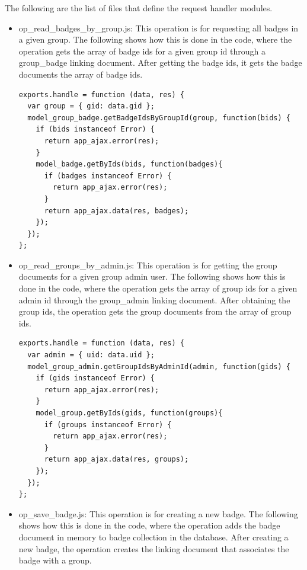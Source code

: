 The following are the list of files that define the request handler modules.

\begin{itemize}
\item op{\_}read{\_}badges{\_}by{\_}group.js: This operation is for requesting all badges in a given group. The following shows how this is done in the code, where the operation gets the array of badge ids for a given group id through a group{\_}badge linking document. After getting the badge ids, it gets the badge documents the array of badge ids. 

\begin{lstlisting}
exports.handle = function (data, res) {
  var group = { gid: data.gid };
  model_group_badge.getBadgeIdsByGroupId(group, function(bids) {
    if (bids instanceof Error) {
      return app_ajax.error(res);
    }
    model_badge.getByIds(bids, function(badges){
      if (badges instanceof Error) {
        return app_ajax.error(res);
      }
      return app_ajax.data(res, badges);
    });
  });
};
\end{lstlisting}

\item op{\_}read{\_}groups{\_}by{\_}admin.js: This operation is for getting the group documents for a given group admin user.  The following shows how this is done in the code, where the operation gets the array of group ids for a given admin id through the group{\_}admin linking document.  After obtaining the group ids, the operation gets the group documents from the array of group ids.

\begin{lstlisting}
exports.handle = function (data, res) {
  var admin = { uid: data.uid };
  model_group_admin.getGroupIdsByAdminId(admin, function(gids) {
    if (gids instanceof Error) {
      return app_ajax.error(res);
    }
    model_group.getByIds(gids, function(groups){
      if (groups instanceof Error) {
        return app_ajax.error(res);
      }
      return app_ajax.data(res, groups);
    });
  });
};
\end{lstlisting}

\item op{\_}save{\_}badge.js: This operation is for creating a new badge. The following shows how this is done in the code, where the operation adds the badge document in memory to badge collection in the database.  After creating a new badge, the operation creates the linking document that associates the badge with a group. 


\end{itemize}
